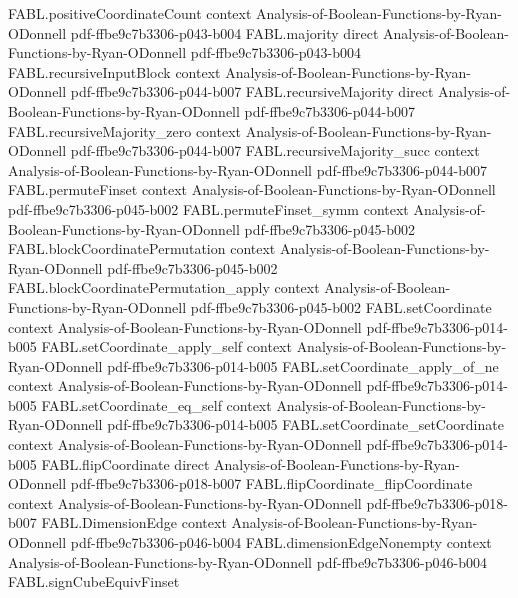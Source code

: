 \begin{theorem}
\proofstep
  {FABL.positiveCoordinateCount}
  {context}
  {Analysis-of-Boolean-Functions-by-Ryan-ODonnell}
  {pdf-ffbe9c7b3306-p043-b004}
\proofstep
  {FABL.majority}
  {direct}
  {Analysis-of-Boolean-Functions-by-Ryan-ODonnell}
  {pdf-ffbe9c7b3306-p043-b004}
\proofstep
  {FABL.recursiveInputBlock}
  {context}
  {Analysis-of-Boolean-Functions-by-Ryan-ODonnell}
  {pdf-ffbe9c7b3306-p044-b007}
\proofstep
  {FABL.recursiveMajority}
  {direct}
  {Analysis-of-Boolean-Functions-by-Ryan-ODonnell}
  {pdf-ffbe9c7b3306-p044-b007}
\proofstep
  {FABL.recursiveMajority_zero}
  {context}
  {Analysis-of-Boolean-Functions-by-Ryan-ODonnell}
  {pdf-ffbe9c7b3306-p044-b007}
\proofstep
  {FABL.recursiveMajority_succ}
  {context}
  {Analysis-of-Boolean-Functions-by-Ryan-ODonnell}
  {pdf-ffbe9c7b3306-p044-b007}
\proofstep
  {FABL.permuteFinset}
  {context}
  {Analysis-of-Boolean-Functions-by-Ryan-ODonnell}
  {pdf-ffbe9c7b3306-p045-b002}
\proofstep
  {FABL.permuteFinset_symm}
  {context}
  {Analysis-of-Boolean-Functions-by-Ryan-ODonnell}
  {pdf-ffbe9c7b3306-p045-b002}
\proofstep
  {FABL.blockCoordinatePermutation}
  {context}
  {Analysis-of-Boolean-Functions-by-Ryan-ODonnell}
  {pdf-ffbe9c7b3306-p045-b002}
\proofstep
  {FABL.blockCoordinatePermutation_apply}
  {context}
  {Analysis-of-Boolean-Functions-by-Ryan-ODonnell}
  {pdf-ffbe9c7b3306-p045-b002}
\proofstep
  {FABL.setCoordinate}
  {context}
  {Analysis-of-Boolean-Functions-by-Ryan-ODonnell}
  {pdf-ffbe9c7b3306-p014-b005}
\proofstep
  {FABL.setCoordinate_apply_self}
  {context}
  {Analysis-of-Boolean-Functions-by-Ryan-ODonnell}
  {pdf-ffbe9c7b3306-p014-b005}
\proofstep
  {FABL.setCoordinate_apply_of_ne}
  {context}
  {Analysis-of-Boolean-Functions-by-Ryan-ODonnell}
  {pdf-ffbe9c7b3306-p014-b005}
\proofstep
  {FABL.setCoordinate_eq_self}
  {context}
  {Analysis-of-Boolean-Functions-by-Ryan-ODonnell}
  {pdf-ffbe9c7b3306-p014-b005}
\proofstep
  {FABL.setCoordinate_setCoordinate}
  {context}
  {Analysis-of-Boolean-Functions-by-Ryan-ODonnell}
  {pdf-ffbe9c7b3306-p014-b005}
\proofstep
  {FABL.flipCoordinate}
  {direct}
  {Analysis-of-Boolean-Functions-by-Ryan-ODonnell}
  {pdf-ffbe9c7b3306-p018-b007}
\proofstep
  {FABL.flipCoordinate_flipCoordinate}
  {context}
  {Analysis-of-Boolean-Functions-by-Ryan-ODonnell}
  {pdf-ffbe9c7b3306-p018-b007}
\proofstep
  {FABL.DimensionEdge}
  {context}
  {Analysis-of-Boolean-Functions-by-Ryan-ODonnell}
  {pdf-ffbe9c7b3306-p046-b004}
\proofstep
  {FABL.dimensionEdgeNonempty}
  {context}
  {Analysis-of-Boolean-Functions-by-Ryan-ODonnell}
  {pdf-ffbe9c7b3306-p046-b004}
\proofstep
  {FABL.signCubeEquivFinset}

\end{theorem}
